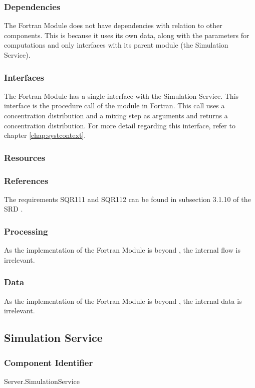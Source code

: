 \subsubsection*{Dependencies}
The Fortran Module does not have dependencies with relation to other components. This is because it uses its own data, along with the parameters for computations and only interfaces with its parent module (the Simulation Service).

\subsubsection*{Interfaces}
The Fortran Module has a single interface with the Simulation Service. This interface is the procedure call of the module in Fortran. This call uses a concentration distribution and a mixing step as arguments and returns a concentration distribution. For more detail regarding this interface, refer to  chapter \ref{chap:systcontext}.

\subsubsection*{Resources}

\subsubsection*{References}
The requirements SQR111 and SQR112 can be found in subsection 3.1.10 of the SRD \cite{srd}.

\subsubsection*{Processing}
As the implementation of the Fortran Module is beyond \projectname, the internal flow is irrelevant.

\subsubsection*{Data}
As the implementation of the Fortran Module is beyond \projectname, the internal data is irrelevant.

\subsection{Simulation Service}

\subsubsection*{Component Identifier}
Server.SimulationService

